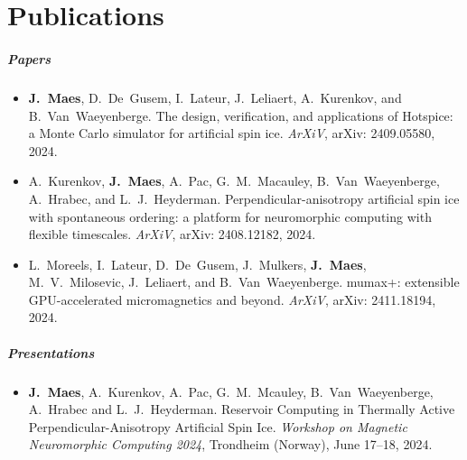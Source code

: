 \chapter{Publications}
\renewcommand{\bibitem}[1]{\item}

\paragraph*{Papers}
\begin{itemize}
    \bibitem{MAES-24}
    \textbf{J.~Maes}, D.~De~Gusem, I.~Lateur, J.~Leliaert, A.~Kurenkov, and B.~Van~Waeyenberge.
    \newblock The design, verification, and applications of Hotspice: a Monte Carlo simulator for artificial spin ice.
    \newblock \emph{ArXiV}, arXiv: 2409.05580, 2024.

    \bibitem{KUR-24}
    A.~Kurenkov, \textbf{J.~Maes}, A.~Pac, G.~M.~Macauley, B.~Van~Waeyenberge, A.~Hrabec, and L.~J.~Heyderman.
    \newblock Perpendicular-anisotropy artificial spin ice with spontaneous ordering: a platform for neuromorphic computing with flexible timescales.
    \newblock \emph{ArXiV}, arXiv: 2408.12182, 2024.

    \bibitem{MOR-24}
    L.~Moreels, I.~Lateur, D.~De~Gusem, J.~Mulkers, \textbf{J.~Maes}, M.~V.~Milosevic, J.~Leliaert, and B.~Van~Waeyenberge.
    \newblock mumax+: extensible GPU-accelerated micromagnetics and beyond.
    \newblock \emph{ArXiV}, arXiv: 2411.18194, 2024.
\end{itemize}

\paragraph*{Presentations}
\begin{itemize}
    \bibitem{SPINENGINE-24}
    \textbf{J.~Maes}, A.~Kurenkov, A.~Pac, G.~M.~Mcauley, B.~Van~Waeyenberge, A.~Hrabec and L.~J.~Heyderman.
    \newblock Reservoir Computing in Thermally Active Perpendicular-Anisotropy Artificial Spin Ice.
    \newblock \emph{Workshop on Magnetic Neuromorphic Computing 2024}, Trondheim (Norway), June 17--18, 2024.
\end{itemize}

